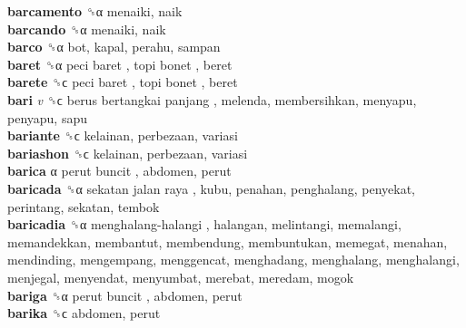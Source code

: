 \textbf{barcamento} ␝α  menaiki, naik  \\
\textbf{barcando} ␝α  menaiki, naik  \\
\textbf{barco} ␝α  bot, kapal, perahu, sampan  \\
\textbf{baret} ␝α   peci baret ,  topi bonet , beret  \\
\textbf{barete} ␝ϲ   peci baret ,  topi bonet , beret  \\
\textbf{bari} \emph{v}  ␝ϲ   berus bertangkai panjang , melenda, membersihkan, menyapu, penyapu, sapu  \\
\textbf{bariante} ␝ϲ  kelainan, perbezaan, variasi  \\
\textbf{bariashon} ␝ϲ  kelainan, perbezaan, variasi  \\
\textbf{barica} α   perut buncit , abdomen, perut  \\
\textbf{baricada} ␝α   sekatan jalan raya , kubu, penahan, penghalang, penyekat, perintang, sekatan, tembok  \\
\textbf{baricadia} ␝α   menghalang-halangi , halangan, melintangi, memalangi, memandekkan, membantut, membendung, membuntukan, memegat, menahan, mendinding, mengempang, menggencat, menghadang, menghalang, menghalangi, menjegal, menyendat, menyumbat, merebat, meredam, mogok  \\
\textbf{bariga} ␝α   perut buncit , abdomen, perut  \\
\textbf{barika} ␝ϲ  abdomen, perut  \\
